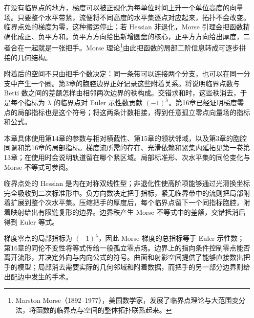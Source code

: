 \ProseParagraphBreak

在没有临界点的地方，梯度可以被正规化为每单位时间上升一个单位高度的向量场。只要整个水平带紧，流便将不同高度的水平集逐点对应起来，拓扑不会改变。临界点处的梯度为零，这种搬运停止；若 Hessian 非退化，Morse 引理会把函数精确化成正、负平方和。负平方方向给出新增圆盘的核心，正平方方向给出厚度，二者合在一起就是一张把手。Morse 理论\footnote{Marston Morse（1892--1977），美国数学家，发展了临界点理论与大范围变分法，将函数的临界点与空间的整体拓扑联系起来。}由此把函数的局部二阶信息转成可逐步拼接的几何结构。

\ProseParagraphBreak

附着后的空间不只由把手个数决定：同一条带可以连接两个分支，也可以在同一分支中产生一个圈。第3章的胞腔边界正好记录这些附着关系。将说明临界点数与 Betti 数之间的差额怎样由相邻两次边界的秩构成。交错求和时，这些秩消去，于是每个指标为 \(\lambda\) 的临界点对 Euler 示性数贡献 \((-1)^\lambda\)。第16章已经证明梯度零点的局部指标也是这个符号；将这两条计数相接，得到任意孤立零点向量场的指标和公式。

\ProseParagraphBreak

本章具体使用第14章的参数与相对横截性、第15章的领状邻域，以及第3章的胞腔同调和第16章的局部指标。梯度流所需的存在、光滑依赖和紧集内延拓见第一卷第13章；在使用时会说明轨道留在哪个紧区域。局部标准形、次水平集的同伦变化与 Morse 不等式可参阅\cite[第2节，Definitions and Lemmas；第3节，Homotopy Type in Terms of Critical Values；第5节，The Morse Inequalities]{Milnor1963Morse}。







\begin{chaptersummary}
	临界点处的 Hessian 是内在对称双线性型；非退化性使高阶项能够通过光滑换坐标完全吸收到二次标准形中。负方向数决定把手指标，紧无临界带中的流则把局部附着扩展到整个次水平集。压缩把手的厚度后，每个临界点留下一个同指标胞腔，附着映射给出有限链复形的边界。边界秩产生 Morse 不等式中的差额，交错抵消后得到 Euler 等式。

	\ProseParagraphBreak

	梯度零点的局部指标为 \((-1)^\lambda\)，因此 Morse 梯度的总指标等于 Euler 示性数；第16章的同伦不变性将等式传给一般孤立零点场。边界上的指向条件控制零点能否离开流形，并决定外向与内向公式的符号。曲面和射影空间提供了能够直接数出把手的模型；局部消去需要实际的几何邻域和附着数据，而把手的另一部分边界则给出配边中发生的手术。
\end{chaptersummary}

